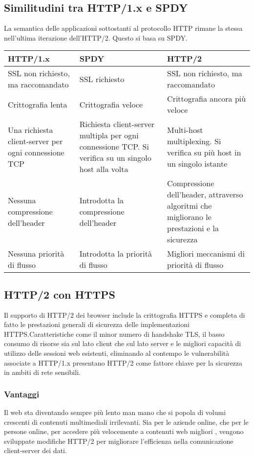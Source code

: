 \documentclass[a4paper,11pt]{article}
\begin{document}
\subsection{Similitudini tra HTTP/1.x e SPDY}
La semantica delle applicazioni sottostanti al protocollo HTTP rimane la stessa nell’ultima iterazione dell’HTTP/2. Questo si basa su SPDY.
\begin{center}
    \begin{tabular}{p{12em}|p{12em}|p{12em}}
        \textbf{HTTP/1.x} & \textbf{SPDY} & \textbf{HTTP/2}\\
        \hline
        SSL non richiesto, ma raccomandato & SSL richiesto & SSL non richiesto, ma raccomandato\\
        \hline
        Crittografia lenta & Crittografia veloce & Crittografia ancora più veloce\\
        \hline
        Una richiesta client-server per ogni connessione TCP & Richiesta client-server multipla per ogni connessione TCP. Si verifica su un singolo host alla volta & Multi-host multiplexing. Si verifica su più host in un singolo istante\\
        \hline
        Nessuna compressione dell’header & Introdotta la compressione dell’header & Compressione dell’header, attraverso algoritmi che migliorano le prestazioni e la sicurezza\\
        \hline
        Nessuna priorità di flusso & Introdotta la priorità di flusso & Migliori meccanismi di priorità di flusso
    \end{tabular}
\end{center}
\subsection{HTTP/2 con HTTPS}
Il supporto di HTTP/2 dei browser include la crittografia HTTPS e completa di fatto le prestazioni generali di sicurezza delle implementazioni HTTPS.\newline Caratteristiche come il minor numero di handshake TLS, il basso consumo di risorse sia sul lato client che sul lato server e le migliori capacità di utilizzo delle sessioni web esistenti, eliminando al contempo le vulnerabilità associate a HTTP/1.x presentano HTTP/2 come fattore chiave per la sicurezza in ambiti di rete sensibili.
\subsubsection{Vantaggi}
Il web sta diventando sempre più lento man mano che si popola di volumi crescenti di contenuti multimediali irrilevanti.\newline
Sia per le aziende online, che per le persone online, per accedere più velocemente a contenuti web migliori , vengono sviluppate modifiche HTTP/2 per migliorare l’efficienza nella comunicazione client-server dei dati.
\end{document}
